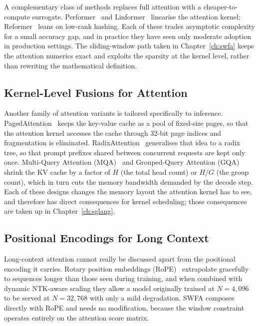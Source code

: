 A complementary class of methods replaces full attention with a
cheaper-to-compute surrogate. Performer~\cite{choromanski2020performer}
and Linformer~\cite{wang2020linformer} linearise the attention kernel;
Reformer~\cite{kitaev2020reformer} leans on low-rank hashing. Each of
these trades asymptotic complexity for a small accuracy gap, and in
practice they have seen only moderate adoption in production
settings. The sliding-window path taken in Chapter~\ref{ch:swfa}
keeps the attention numerics exact and exploits the sparsity at the
kernel level, rather than rewriting the mathematical definition.

\subsection{Kernel-Level Fusions for Attention}\label{sec:lit_fused}
Another family of attention variants is tailored specifically to
inference. PagedAttention~\cite{vllm} keeps the key-value cache as a
pool of fixed-size pages, so that the attention kernel accesses the
cache through 32-bit page indices and fragmentation is eliminated.
RadixAttention~\cite{sglang} generalises that idea to a radix tree,
so that prompt prefixes shared between concurrent requests are kept
only once. Multi-Query Attention (MQA)~\cite{shazeer2019mqa} and
Grouped-Query Attention (GQA)~\cite{ainslie2023gqa} shrink the
KV cache by a factor of $H$ (the total head count) or $H/G$ (the
group count), which in turn cuts the memory bandwidth demanded by
the decode step. Each of these designs changes the memory layout
the attention kernel has to see, and therefore has direct
consequences for kernel scheduling; those consequences are taken
up in Chapter~\ref{ch:sglang}.

\subsection{Positional Encodings for Long
Context}\label{sec:lit_rope}
Long-context attention cannot really be discussed apart from the
positional encoding it carries. Rotary position embeddings
(RoPE)~\cite{su2021rope} extrapolate gracefully to sequences longer
than those seen during training, and when combined with dynamic
NTK-aware scaling they allow a model originally trained at
$N = 4{,}096$ to be served at $N = 32{,}768$ with only a mild
degradation. SWFA composes directly with RoPE and needs no
modification, because the window constraint operates entirely on
the attention score matrix.

